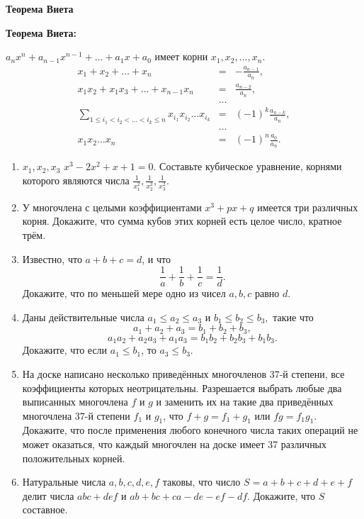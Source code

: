 \documentclass{article}
\begin{document}
\large
	

\begin{center}
\textbf{Теорема Виета}
\end{center}

 \textbf{Теорема Виета:}

 $ a_nx^n + a_{n-1}x^{n-1} + \ldots + a_1x + a_0$ имеет корни $x_1, x_2, \ldots, x_n.$ 
\begin{eqnarray*}
	x_1 + x_2 + \ldots + x_n &=& -\frac{a_{n-1}}{a_n},\\
	x_1x_2 + x_1x_3 + \ldots + x_{n-1}x_n &=& \frac{a_{n-2}}{a_n}, \\
	&\ldots& \\
	\sum_{1\leq i_1 < i_2 < \ldots < i_k \leq n} x_{i_1}x_{i_2}\ldots x_{i_k} &=& (-1)^k\frac{a_{n-k}}{a_n}, \\
	&\ldots& \\
	x_1x_2\ldots x_n &=& (-1)^n\frac{a_0}{a_n}.
\end{eqnarray*}

\begin{enumerate}[label*=\protect\fbox{\arabic{enumi}}]
	
	\item 
	 $x_1, x_2, x_3$  $x^3 - 2x^2 + x + 1 = 0.$
	Составьте кубическое уравнение, корнями которого являются числа $\frac{1}{x_1^2}, \frac{1}{x_2^2}, \frac{1}{x_3^2}$.
	
	\item У многочлена с целыми коэффициентами $x^3 + px + q$ имеется три различных корня. Докажите, что сумма кубов этих корней есть целое число, кратное трём.
	
	\item Известно, что $a + b + c = d$, и что $$\frac{1}{a} + \frac{1}{b} + \frac{1}{c} = \frac{1}{d}.$$
	Докажите, что по меньшей мере одно из чисел $a, b, c$ равно $d$.
	
	\item Даны действительные числа $a_1 \leqslant a_2 \leqslant a_3$  и  $b_1 \leqslant b_2 \leqslant b_3,$
	такие что $$a_1 + a_2 + a_3 = b_1 + b_2 + b_3,$$  $$a_1a_2 + a_2a_3 + a_1a_3 = b_1b_2 + b_2b_3 + b_1b_3.$$
	Докажите, что если $a_1 \leq b_1$, то $a_3 \leq b_3$.
	
	\item На доске написано несколько приведённых многочленов 37-й степени, все коэффициенты которых неотрицательны. Разрешается выбрать любые два выписанных многочлена $f$ и $g$ и заменить их на такие два приведённых многочлена 37-й степени $f_1$ и $g_1$, что $f + g = f_1 + g_1$ или $fg = f_1g_1$. Докажите, что после применения любого конечного числа таких операций не может оказаться, что каждый многочлен на доске имеет 37 различных положительных корней.

	\item Натуральные числа $a, b, c, d, e, f$ таковы, что число $S = a + b + c + d + e + f$ делит
    числа $abc + def$ и  $ab + bc + ca - de - ef - df.$ Докажите, что $S$ составное.




\end{enumerate}
\end{document}
